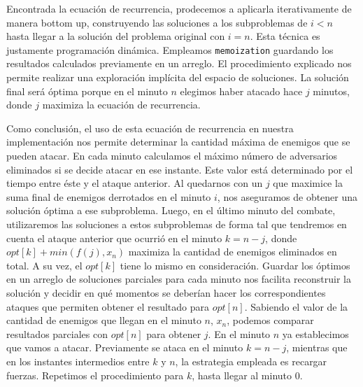 \documentclass{article}
\begin{document}
Encontrada la ecuación de recurrencia, prodecemos a aplicarla iterativamente de manera bottom up, construyendo las soluciones a los subproblemas de $i < n$ hasta llegar a la solución del problema original con $i = n$. Esta técnica es justamente programación dinámica. Empleamos \texttt{memoization} guardando los resultados calculados previamente en un arreglo. El procedimiento explicado nos permite realizar una exploración implícita del espacio de soluciones. La solución final será óptima porque en el minuto $n$ elegimos haber atacado hace $j$ minutos, donde $j$ maximiza la ecuación de recurrencia.

Como conclusión, el uso de esta ecuación de recurrencia en nuestra implementación nos permite determinar la cantidad máxima de enemigos que se pueden atacar. En cada minuto calculamos el  máximo número de adversarios eliminados si se decide atacar en ese instante. Este valor está determinado por el tiempo entre éste y el ataque anterior. Al quedarnos con un $j$ que maximice la suma final de enemigos derrotados en el minuto $i$, nos aseguramos de obtener una solución óptima a ese subproblema. Luego, en el último minuto del combate, utilizaremos las soluciones a estos subproblemas de forma tal que tendremos en cuenta el ataque anterior que ocurrió en el minuto $k = n - j$, donde $opt[k] + min(f(j), x_n)$ maximiza la cantidad de enemigos eliminados en total. A su vez, el $opt[k]$ tiene lo mismo en consideración. Guardar los óptimos en un arreglo de soluciones parciales para cada minuto nos facilita reconstruir la solución y decidir en qué momentos se deberían hacer los correspondientes ataques que permiten obtener el resultado para $opt[n]$. Sabiendo el valor de la cantidad de enemigos que llegan en el minuto $n$, $x_n$, podemos comparar resultados parciales con $opt[n]$ para obtener $j$. En el minuto $n$ ya establecimos que vamos a atacar. Previamente se ataca en el minuto $k = n - j$, mientras que en los instantes intermedios entre $k$ y $n$, la estrategia empleada es recargar fuerzas. Repetimos el procedimiento para $k$, hasta llegar al minuto 0. 
\end{document}
